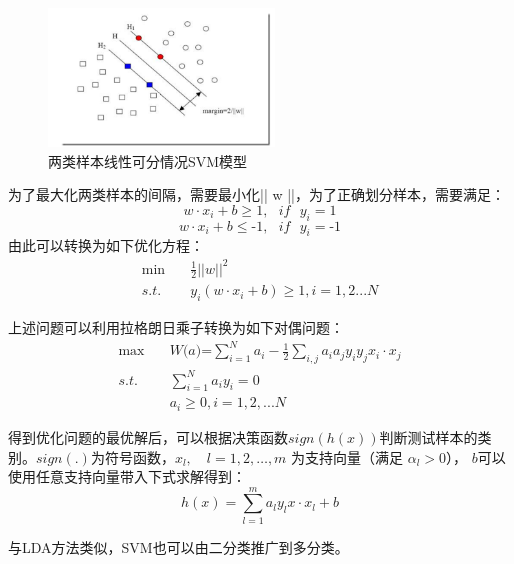 \begin{figure}[htbp]
\centering
\includegraphics[width=6cm]{resource/SVM.png}
\caption{两类样本线性可分情况SVM模型}
\label{fig:SVM}
\end{figure}

为了最大化两类样本的间隔，需要最小化|| w ||，为了正确划分样本，需要满足：
\begin{equation}w\cdot {{x}_{i}}+b\ge 1,\text{ }if\text{ }{{y}_{i}}=1\end{equation}
\begin{equation}w\cdot {{x}_{i}}+b\le \text{-}1,\text{ }if\text{ }{{y}_{i}}=\text{-}1\end{equation}
由此可以转换为如下优化方程：
\begin{align}
\min \quad& \frac{1}{2}||w|{{|}^{2}}\\
s.t.\quad & {{y}_{i}}(w\cdot {{x}_{i}}+b)\ge 1,i=1,2...N
\end{align}

上述问题可以利用拉格朗日乘子转换为如下对偶问题：
\begin{align}
\max \quad & W(a\text{)=}\sum\limits_{i=1}^{N}{{{a}_{i}}}-\frac{1}{2}\sum\limits_{i,j}{{{a}_{i}}}{{a}_{j}}{{y}_{i}}{{y}_{j}}{{x}_{i}}\cdot {{x}_{j}} \\
s.t.\quad & \sum\limits_{i=1}^{N}{{{a}_{i}}}{{y}_{i}}=0 \\
& {{a}_{i}}\ge 0,i=1,2,...N
\end{align}

得到优化问题的最优解后，可以根据决策函数$sign(h(x))$判断测试样本的类别。$sign(.)$为符号函数，$x_l,\quad l=1,2,…,m$ 为支持向量（满足 $\alpha_l>0$）， $b$可以使用任意支持向量带入下式求解得到：
\begin{equation}
h(x)=\sum\limits_{l=1}^{m}{{{a}_{l}}}{{y}_{l}}x\cdot {{x}_{l}}+b
\end{equation}

与LDA方法类似，SVM也可以由二分类推广到多分类。


